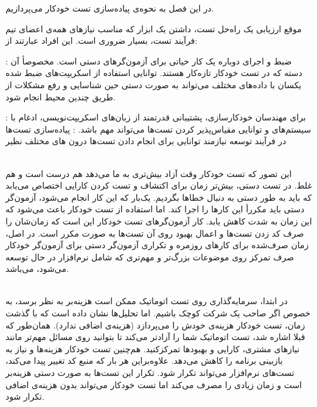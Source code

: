 
در این فصل به نحوه‌ی پیاده‌سازی تست خودکار می‌پردازیم. 


موقع ارزیابی یک راه‌حل تست، داشتن یک ابزار که مناسب نیاز‌های همه‌ی اعضای تیم فرآیند تست، بسیار ضروری است. این افراد عبارتند از:

 :‌ ضبط و اجرای دوباره یک کار حیاتی برای آزمون‌گرهای دستی است. مخصوصأ آن دسته که در تست خودکار تازه‌کار هستند. توانایی استفاده از اسکریپت‌های ضبط شده یکسان با داده‌های مختلف می‌تواند به صورت دستی حین شناسایی و رفع مشکلات از طریق چندین محیط انجام شود.

 : برای مهندسان خودکارسازی، پشتیبانی قدرتمند از زبان‌های اسکریپت‌نویسی، ادغام با سیستم‌های  و توانایی مقیاس‌پذیر کردن تست‌ها می‌تواند مهم باشد.
 : پیاده‌سازی تست‌ها در فرآیند توسعه نیازمند توانایی برای انجام دادن تست‌ها درون های مختلف نظیر 


 
\\
این تصور که تست خودکار وقت آزاد بیش‌تری به ما می‌دهد هم درست است و هم غلط.
در تست دستی، بیش‌تر زمان برای اکتشاف و تست کردن کارایی اختصاص می‌یابد که باید به طور دستی به دنبال خطاها بگردیم. یک‌بار که این کار انجام می‌شود، آزمون‌گر دستی باید مکررأ این کارها را اجرا کند. اما استفاده از تست خودکار باعث می‌شود که این زمان به شدت کاهش یابد. کار آزمون‌گرهای تست خودکار این است که زمان‌شان را صرف کد زدن تست‌ها و اعمال بهبود روی آن تست‌ها به صورت مکرر است. در اصل، زمان صرف‌شده برای کارهای روزمره و تکراری آزمون‌گر دستی برای آزمون‌گر خودکار صرف تمرکز روی موضوعات بزرگ‌تر و مهم‌تری که شامل نرم‌افزار در حال توسعه می‌شود، می‌باشد.

 
\\
در ابتدا، سرمایه‌گذاری روی تست اتوماتیک ممکن است هزینه‌بر به نظر برسد، به خصوص اگر صاحب یک شرکت کوچک باشیم. اما تحلیل‌ها نشان داده است که با گذشت زمان، تست خودکار هزینه‌ی خودش را می‌پردازد (هزینه‌ی اضافی ندارد). همان‌طور که قبلا اشاره شد، تست اتوماتیک شما را آزادتر می‌کند تا بتوانید روی مسائل مهم‌تر مانند نیاز‌های مشتری، کارایی و بهبودها تمرکزکنید. هم‌چنین تست خودکار هزینه‌ها و نیاز به بازبینی برنامه را کاهش می‌دهد. علاوه‌براین هر بار که منبع کد تغییر پیدا می‌کند، تست‌های نرم‌افزار می‌تواند تکرار شود. تکرار این تست‌ها به صورت دستی هزینه‌بر است و زمان زیادی را مصرف می‌کند اما تست خودکار می‌تواند بدون هزینه‌ی اضافی تکرار شود.

